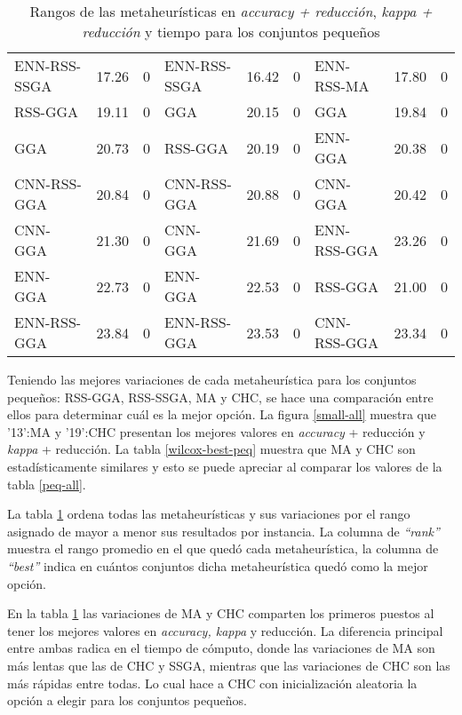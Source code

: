 \begin{table}[h!]
\begin{adjustbox}{max width =\textwidth}
\begin{tabular}{l c c|l c c|l c c}
ENN-RSS-SSGA & 17.26 & 0 & ENN-RSS-SSGA & 16.42 & 0  & ENN-RSS-MA   & 17.80 & 0 \\
RSS-GGA      & 19.11 & 0 & GGA          & 20.15 & 0  & GGA          & 19.84 & 0 \\
GGA          & 20.73 & 0 & RSS-GGA      & 20.19 & 0  & ENN-GGA      & 20.38 & 0 \\
CNN-RSS-GGA  & 20.84 & 0 & CNN-RSS-GGA  & 20.88 & 0  & CNN-GGA      & 20.42 & 0 \\
CNN-GGA      & 21.30 & 0 & CNN-GGA      & 21.69 & 0  & ENN-RSS-GGA  & 23.26 & 0 \\
ENN-GGA      & 22.73 & 0 & ENN-GGA      & 22.53 & 0  & RSS-GGA      & 21.00 & 0 \\
ENN-RSS-GGA  & 23.84 & 0 & ENN-RSS-GGA  & 23.53 & 0  & CNN-RSS-GGA  & 23.34 & 0 \\



\hline
\end{tabular}
\end{adjustbox}
\caption{Rangos de las metaheurísticas en \emph{accuracy + reducción}, \emph{kappa + reducción} y tiempo para los conjuntos pequeños}
\label{rank-peq}
\end{table} 


Teniendo las mejores variaciones de cada metaheurística para los conjuntos pequeños: RSS-GGA, RSS-SSGA, MA y CHC, se hace una comparación entre ellos para determinar cuál es la mejor opción. La figura \ref{small-all} muestra que '13':MA y '19':CHC presentan los mejores valores en \emph{accuracy} + reducción y \emph{kappa} + reducción. La tabla \ref{wilcox-best-peq} muestra que MA y CHC son estadísticamente similares y esto se puede apreciar al comparar los valores de la tabla \ref{peq-all}. 

La tabla \ref{rank-peq} ordena todas las metaheurísticas y sus variaciones por el rango asignado de mayor a menor sus resultados por instancia. La columna de  \emph{``rank''} muestra el rango promedio en el que quedó cada metaheurística, la columna de \emph{``best''} indica en cuántos conjuntos dicha metaheurística quedó como la mejor opción.

En la tabla \ref{rank-peq} las variaciones de MA y CHC comparten los primeros puestos al tener los mejores valores en \emph{accuracy, kappa} y reducción. La diferencia principal entre ambas radica en el tiempo de cómputo, donde las variaciones de MA son más lentas que las de CHC y SSGA, mientras que las variaciones de CHC son las más rápidas entre todas. Lo cual hace a CHC con inicialización aleatoria la opción a elegir para los conjuntos pequeños.

